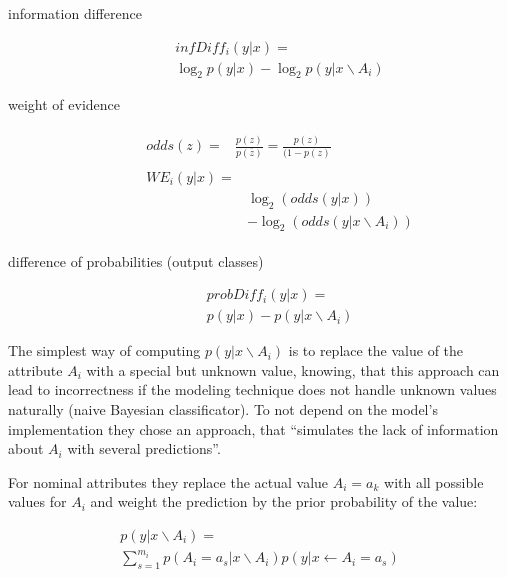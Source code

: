\begin{description}
    \item[information difference] 
    \begin{multline}
        infDiff_{i}(y|x) = \\
        \log_{2} p(y|x)−\log_{2} p(y|x \backslash A_{i})
    \end{multline}
    \item[weight of evidence] 
    \begin{align}
        \begin{split}
            odds(z) ={}& \frac{p(z)}{p(\bar{z})} = \frac{p(z)}{(1 − p(z)}
        \end{split}\\
        \begin{split}
            WE_{i}(y|x) ={}& \\
            & \log_{2} (odds(y|x)) \\
            & - \log_{2}(odds(y|x \backslash A_{i}))    
        \end{split}
    \end{align}
    \item[difference of probabilities (output classes)]
    \begin{multline}
        probDiff_{i} (y|x) = \\
    p(y|x)− p(y|x \backslash A_{i})
    \end{multline}
\end{description}
The simplest way of computing \(p(y|x \backslash A_{i})\) is to replace the value of the attribute \(A_{i}\) with a special but unknown value, knowing, that this approach can lead to incorrectness if the modeling technique does not handle unknown values naturally (naive Bayesian classificator).
To not depend on the model's implementation they chose an approach, that “simulates the lack of information about \(A_{i}\) with several predictions”\cite[p.4]{RobnikSikonja.2008}.
\par
For  nominal attributes they replace the actual value \(A_{i} = a_{k}\) with all possible values for \(A_{i}\) and weight the prediction by the prior probability of the value: 
\par
        \begin{multline} 
            p(y|x \backslash A_{i}) = \\ 
            \sum_{s=1}^{m_{i}} p(A_{i} = a_{s} | x \backslash A_{i})p(y|x \leftarrow A_{i} = a_{s})
        \end{multline}
        \par
    
